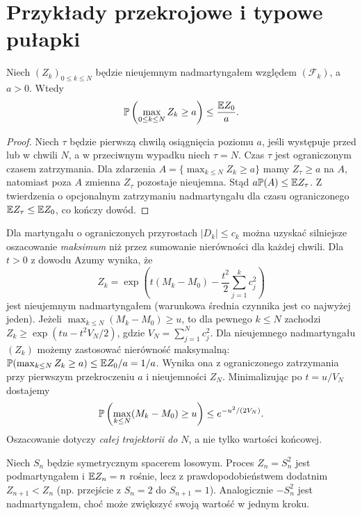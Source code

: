 \section{Przykłady przekrojowe i typowe pułapki}


\begin{lemat}
Niech $(Z_k)_{0\leq k\leq N}$ będzie
nieujemnym nadmartyngałem względem $(\mathcal F_k)$,
a $a>0$. Wtedy
\[
\mathbb{P}\left(\max_{0\leq k\leq N}Z_k\geq a\right)
\leq\frac{\mathbb{E} Z_0}{a}.
\]
\end{lemat}
\begin{proof}
Niech $\tau$ będzie pierwszą chwilą osiągnięcia
poziomu $a$, jeśli występuje przed lub w chwili $N$,
a w przeciwnym wypadku niech $\tau=N$.
Czas $\tau$ jest ograniczonym czasem zatrzymania.
Dla zdarzenia $A=\{\max_{k\leq N}Z_k\geq a\}$
mamy $Z_\tau\geq a$ na $A$, natomiast poza $A$
zmienna $Z_\tau$ pozostaje nieujemna.
Stąd $a\mathbb{P}(A)\leq\mathbb{E} Z_\tau$.
Z twierdzenia o opcjonalnym zatrzymaniu
nadmartyngału dla czasu ograniczonego
$\mathbb{E} Z_\tau\leq\mathbb{E} Z_0$, co kończy dowód.
\end{proof}

\begin{przyklad}
Dla martyngału o ograniczonych przyrostach
$|D_k|\leq c_k$ można uzyskać silniejsze
oszacowanie \emph{maksimum} niż przez
sumowanie nierówności dla każdej chwili.
Dla $t>0$ z dowodu Azumy wynika, że
\[
Z_k=\exp\left(t(M_k-M_0)-\frac{t^2}{2}
\sum_{j=1}^k c_j^2\right)
\]
jest nieujemnym nadmartyngałem (warunkowa średnia
czynnika jest co najwyżej jeden).
Jeżeli $\max_{k\leq N}(M_k-M_0)\geq u$, to dla
pewnego $k\leq N$ zachodzi
$Z_k\geq\exp(tu-t^2V_N/2)$, gdzie
$V_N=\sum_{j=1}^N c_j^2$.
Dla nieujemnego nadmartyngału $(Z_k)$
możemy zastosować nierówność maksymalną:
$\mathbb{P}(\max_{k\leq N}Z_k\geq a)\leq\mathbb{E} Z_0/a=1/a$.
Wynika ona z ograniczonego zatrzymania przy
pierwszym przekroczeniu $a$ i nieujemności
$Z_N$.
Minimalizując po $t=u/V_N$ dostajemy
\[
\mathbb{P}\left(\max_{k\leq N}(M_k-M_0)\geq u\right)
\leq e^{-u^2/(2V_N)}.
\]
Oszacowanie dotyczy \emph{całej trajektorii do $N$},
a nie tylko wartości końcowej.
\end{przyklad}

\begin{przyklad}
Niech $S_n$ będzie symetrycznym spacerem losowym.
Proces $Z_n=S_n^2$ jest podmartyngałem i
$\mathbb{E} Z_n=n$ rośnie, lecz z prawdopodobieństwem
dodatnim $Z_{n+1}<Z_n$ (np. przejście z
$S_n=2$ do $S_{n+1}=1$). Analogicznie
$-S_n^2$ jest nadmartyngałem, choć
może zwiększyć swoją wartość w jednym kroku.
\end{przyklad}

